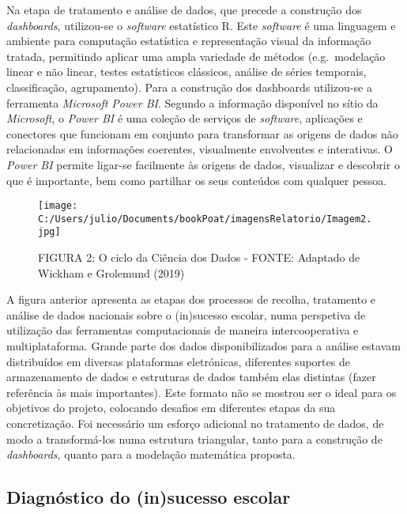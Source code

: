 \documentclass[
]{book}
\begin{document}
Na etapa de tratamento e análise de dados, que precede a construção dos \emph{dashboards}, utilizou-se o \emph{software} estatístico R. Este \emph{software} é uma linguagem e ambiente para computação estatística e representação visual da informação tratada, permitindo aplicar uma ampla variedade de métodos (e.g.~modelação linear e não linear, testes estatísticos clássicos, análise de séries temporais, classificação, agrupamento). Para a construção dos dashboards utilizou-se a ferramenta \emph{Microsoft Power BI}. Segundo a informação disponível no sítio da \emph{Microsoft}, o \emph{Power BI} é uma coleção de serviços de \emph{software}, aplicações e conectores que funcionam em conjunto para transformar as origens de dados não relacionadas em informações coerentes, visualmente envolventes e interativas. O \emph{Power BI} permite ligar-se facilmente às origens de dados, visualizar e descobrir o que é importante, bem como partilhar os seus conteúdos com qualquer pessoa.

\begin{figure}
\centering
\texttt{[image: C:/Users/julio/Documents/bookPoat/imagensRelatorio/Imagem2.jpg]}
\caption{FIGURA 2: O ciclo da Ciência dos Dados - FONTE: Adaptado de Wickham e Grolemund (2019)}
\end{figure}

A figura anterior apresenta as etapas dos processos de recolha, tratamento e análise de dados nacionais sobre o (in)sucesso escolar, numa perspetiva de utilização das ferramentas computacionais de maneira intercooperativa e multiplataforma. Grande parte dos dados disponibilizados para a análise estavam distribuídos em diversas plataformas eletrónicas, diferentes suportes de armazenamento de dados e estruturas de dados também elas distintas (fazer referência às mais importantes). Este formato não se mostrou ser o ideal para os objetivos do projeto, colocando desafios em diferentes etapas da sua concretização. Foi necessário um esforço adicional no tratamento de dados, de modo a transformá-los numa estrutura triangular, tanto para a construção de \emph{dashboards}, quanto para a modelação matemática proposta.

\hypertarget{diagnuxf3stico-do-insucesso-escolar}{%
\subsection{\texorpdfstring{\textbf{Diagnóstico do (in)sucesso escolar}}{Diagnóstico do (in)sucesso escolar}}\label{diagnuxf3stico-do-insucesso-escolar}}
\end{document}

